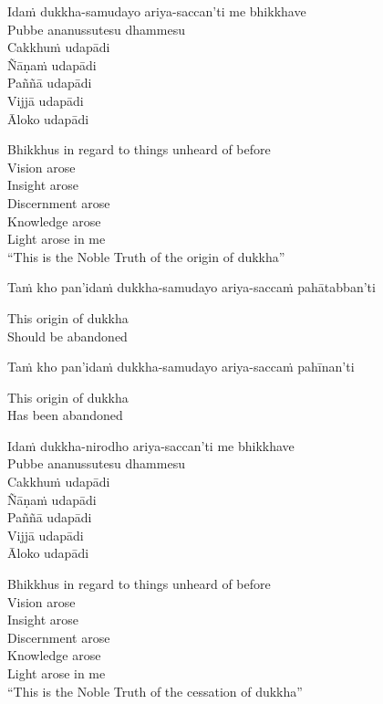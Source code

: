 Idaṁ dukkha-samudayo ariya-saccan’ti me bhikkhave\\
Pubbe ananussutesu dhammesu\\
Cakkhuṁ udapādi\\
Ñāṇaṁ udapādi\\
Paññā udapādi\\
Vijjā udapādi\\
Āloko udapādi

\begin{english}
  Bhikkhus in regard to things unheard of before\\
  Vision arose\\
  Insight arose\\
  Discernment arose\\
  Knowledge arose\\
  Light arose in me\\
  “This is the Noble Truth of the origin of dukkha”
\end{english}

Taṁ kho pan’idaṁ dukkha-samudayo ariya-saccaṁ pahātabban’ti

\begin{english}
  This origin of dukkha\\
  Should be abandoned
\end{english}

Taṁ kho pan’idaṁ dukkha-samudayo ariya-saccaṁ pahīnan’ti

\begin{english}
  This origin of dukkha\\
  Has been abandoned
\end{english}

Idaṁ dukkha-nirodho ariya-saccan’ti me bhikkhave\\
Pubbe ananussutesu dhammesu\\
Cakkhuṁ udapādi\\
Ñāṇaṁ udapādi\\
Paññā udapādi\\
Vijjā udapādi\\
Āloko udapādi

\begin{english}
  Bhikkhus in regard to things unheard of before\\
  Vision arose\\
  Insight arose\\
  Discernment arose\\
  Knowledge arose\\
  Light arose in me\\
  “This is the Noble Truth of the cessation of dukkha”
\end{english}

